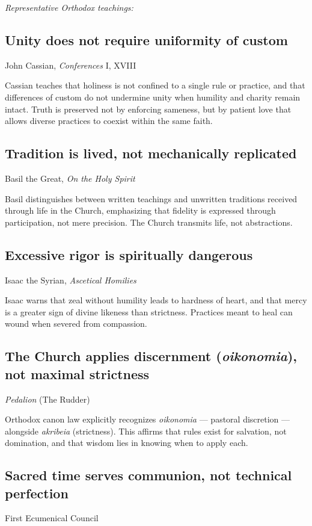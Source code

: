 \documentclass[10pt,twoside,openany]{book}
\begin{document}
\medskip
\textit{Representative Orthodox teachings:}

\subsection{Unity does not require uniformity of custom}
{\small John Cassian, \emph{Conferences} I, XVIII}

Cassian teaches that holiness is not confined to a single rule or
practice, and that differences of custom do not undermine unity when
humility and charity remain intact. Truth is preserved not by enforcing
sameness, but by patient love that allows diverse practices to coexist
within the same faith.

\subsection{Tradition is lived, not mechanically replicated}
{\small Basil the Great, \emph{On the Holy Spirit}}

Basil distinguishes between written teachings and unwritten traditions
received through life in the Church, emphasizing that fidelity is
expressed through participation, not mere precision. The Church
transmits life, not abstractions.

\subsection{Excessive rigor is spiritually dangerous}
{\small Isaac the Syrian, \emph{Ascetical Homilies}}

Isaac warns that zeal without humility leads to hardness of heart, and
that mercy is a greater sign of divine likeness than strictness.
Practices meant to heal can wound when severed from compassion.

\subsection{The Church applies discernment (\emph{oikonomia}), not maximal strictness}
{\small \emph{Pedalion} (The Rudder)}

Orthodox canon law explicitly recognizes \emph{oikonomia} --- pastoral
discretion --- alongside \emph{akribeia} (strictness). This affirms that rules
exist for salvation, not domination, and that wisdom lies in knowing
when to apply each.

\subsection{Sacred time serves communion, not technical perfection}
{\small First Ecumenical Council}
\end{document}
